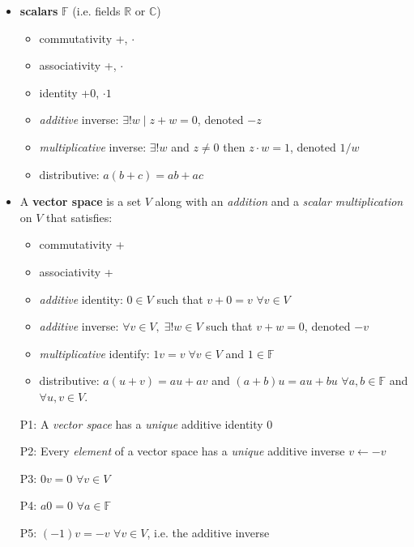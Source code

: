 \documentclass[11pt,notitlepage,oneside]{article}
\begin{document}
\begin{itemize}
\item \textbf{scalars} $\mathbb{F}$ (i.e. fields $\mathbb{R}$ or $\mathbb{C}$)
\begin{itemize}
\item commutativity +, $\cdot$
\item associativity +, $\cdot$
\item identity +0, $\cdot 1$
\item \emph{additive} inverse: $\exists!w \mid z + w = 0$, denoted $-z$
\item \emph{multiplicative} inverse: $\exists!w$ and $z\neq0$ then $z\cdot w = 1$, denoted $1/w$
\item distributive: $a(b+c) = ab+ac$
\end{itemize}
\item A \textbf{vector space} is a set $V$ along with an \emph{addition}  and a \emph{scalar multiplication} on $V$ that satisfies:
\begin{itemize}
\item commutativity +
\item associativity +
\item \emph{additive} identity: $0\in V$ such that $v+0=v$ $\forall v\in V$
\item \emph{additive} inverse: $\forall v\in V,\; \exists!w\in V$ such that $v+w=0$, denoted $-v$
\item \emph{multiplicative} identify: $1v=v\;\forall v\in V$ and $1\in\mathbb{F}$
\item distributive: $a(u+v)=au+av$ and $(a+b)u=au+bu$ $\forall a,b\in\mathbb{F}$ and $\forall u,v \in V$.
\end{itemize}
 
\item[P1:\label{it:P1_1}] A \emph{vector space} has a \emph{unique} additive identity $0$
\item[P2:\label{it:P1_2}] Every \emph{element} of a vector space has a \emph{unique} additive inverse $v\leftarrow -v$
\item[P3:] $0v=0$ $\forall v\in V$
\item[P4:] $a0=0$ $\forall a\in \mathbb{F}$
\item[P5:] $(-1)v = -v$ $\forall v\in V$, i.e. the additive inverse


\end{itemize}
\end{document}
